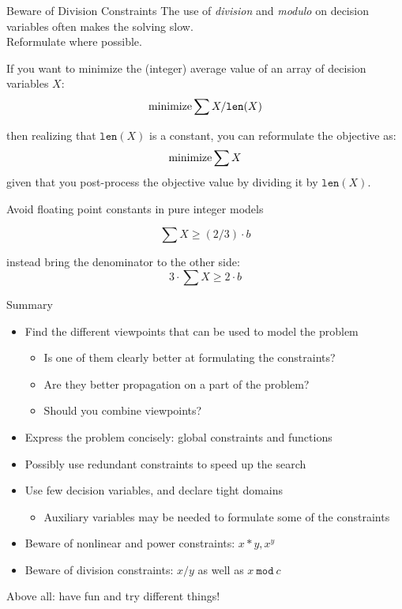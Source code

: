 \documentclass{cons-beamer}
\begin{document}
\begin{frame}{Beware of Division Constraints}
  \alert{The use of \textit{division} and \textit{modulo} on decision variables often makes the solving slow.} \\
  Reformulate where possible.
  \vfill

  \begin{example}
    If you want to minimize the (integer) average value of an array of decision variables $X$:
    \[
      \operatorname*{minimize} \sum X / \mathtt{len}(X)
    \]

    then realizing that $\mathtt{len}(X)$ is a constant, you can reformulate the objective as:
    \[
      \operatorname*{minimize} \sum X
    \]
    given that you post-process the objective value by dividing it by $\mathtt{len}(X)$.
  \end{example}  
\end{frame}

\begin{frame}{Avoid floating point constants in pure integer models}
  \begin{example}[]
    \[
      \sum X \geq (2/3) \cdot b
    \]
    
    instead bring the denominator to the other side:
    \[
      3\cdot \sum X \geq 2\cdot b
    \]
  \end{example}
\end{frame}


\begin{frame}{Summary}
  \begin{itemize}
    \item Find the different viewpoints that can be used to model the problem
      \begin{itemize}
        \item Is one of them clearly better at formulating the constraints?
        \item Are they better propagation on a part of the problem?
        \item Should you combine viewpoints?
      \end{itemize}
    \item Express the problem concisely: global constraints and functions
    \item Possibly use redundant constraints to speed up the search
    \item Use few decision variables, and declare tight domains
      \begin{itemize}
        \item Auxiliary variables may be needed to formulate some of the constraints
      \end{itemize}
    \item Beware of nonlinear and power constraints: $x*y, x^y$
    \item Beware of division constraints: 
      $x / y$ as well as $x ~\mathtt{mod}~ c$
  \end{itemize}
  \vfill

  Above all: have fun and try different things!
\end{frame}
\end{document}
